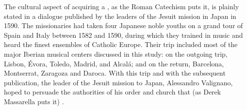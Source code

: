 The cultural aspect of acquiring a , as the Roman
Catechism puts it, is plainly stated in a dialogue published by the leaders of
the Jesuit mission in Japan in 1590.%
    \Autocite{Sande:DeMissioneLegatorum}
The missionaries had taken four Japanese noble youths on a grand tour of Spain
and Italy between 1582 and 1590, during which they trained in music and heard
the finest ensembles of Catholic Europe.
Their trip included most of the major Iberian musical centers discussed in this
study: on the outgoing trip, Lisbon, Évora, Toledo, Madrid, and Alcalá; and on
the return, Barcelona, Montserrat, Zaragoza and Daroca.
With this trip and with the subsequent publication, the leader of the Jesuit
mission to Japan, Alessandro Valignano, hoped to persuade the authorities of his
order and church that (as Derek Massarella puts it) .%
    \Autocite[4]{Massarella:JapaneseTravellers}

